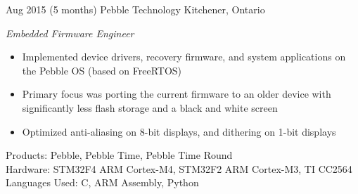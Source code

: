 \documentclass[print]{friggeri-cv} %
\begin{document}
\begin{entrylist}
\entry
{Aug 2015}
{(5 months)}
{Pebble Technology}
{Kitchener, Ontario}
{\emph{Embedded Firmware Engineer}
\begin{itemize}
\item Implemented device drivers, recovery firmware, and system applications on the Pebble OS (based on FreeRTOS)
\item Primary focus was porting the current firmware to an older device with significantly less flash storage and a black and white screen
\item Optimized anti-aliasing on 8-bit displays, and dithering on 1-bit displays
\end{itemize}
Products: Pebble, Pebble Time, Pebble Time Round \\
Hardware: STM32F4 ARM Cortex-M4, STM32F2 ARM Cortex-M3, TI CC2564
Languages Used: C, ARM Assembly, Python \\
}

\end{entrylist}

\goodbreak
{}
\renewcommand{\entry}[5]{%
  \parbox[t]{1.4cm}{\footnotesize \textbf{#1} \\ \scriptsize\addfontfeature{Color=lightgray} #2}&\parbox[t]{18.0cm}{%
    \textbf{#3}%
    \hfill%
    {\footnotesize\addfontfeature{Color=lightgray} #4}%
    \justify #5\vspace{\parsep}%
  }\\}
\end{document}
